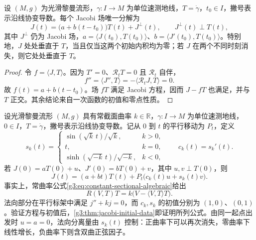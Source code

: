 \begin{proposition}\label{g3:prop:jacobi-tangential-normal}
	设 \((M,g)\) 为光滑黎曼流形，\(\gamma:I\to M\) 为单位速测地线，\(T=\dot\gamma\)，\(t_0\in I\)，撇号表示沿线协变导数。每个 Jacobi 场唯一分解为
	\begin{equation}\label{g3:eq:jacobi-tangential-normal}
		J(t)=\bigl(a+b(t-t_0)\bigr)T(t)+J^\perp(t),
		\qquad J^\perp(t)\perp T(t),
	\end{equation}
	其中 \(J^\perp\) 仍为 Jacobi 场，\(a=\langle J(t_0),T(t_0)\rangle\)、\(b=\langle J'(t_0),T(t_0)\rangle\)。特别地，\(J\) 处处垂直于 \(T\)，当且仅当这两个初始内积均为零；若 \(J\) 在两个不同时刻消失，则它处处垂直于 \(T\)。
\end{proposition}
\begin{proof}
	令 \(f=\langle J,T\rangle\)。因为 \(T'=0\)、\(\mathcal R_tT=0\) 且 \(\mathcal R_t\) 自伴，
	\[
		f''=\langle J'',T\rangle=-\langle\mathcal R_tJ,T\rangle=0.
	\]
	故 \(f(t)=a+b(t-t_0)\)。场 \(fT\) 满足 Jacobi 方程，因而 \(J-fT\) 也满足，并与 \(T\) 正交。其余结论来自一次函数的初值和零点性质。
\end{proof}

\begin{example}\label{g3:exm:constant-curvature-jacobi}
	设光滑黎曼流形 \((M,g)\) 具有常截面曲率 \(k\in\mathbb R\)，\(\gamma:I\to M\) 为单位速测地线，\(0\in I\)，\(T=\dot\gamma\)，撇号表示沿线协变导数。记从 \(0\) 到 \(t\) 的平行移动为 \(P_t\)，定义
	\begin{equation}\label{g3:eq:model-jacobi-functions}
		s_k(t)=
		\begin{cases}
			\sin(\sqrt{k}\,t)/\sqrt{k},&k>0,\\
			t,&k=0,\\
			\sinh(\sqrt{-k}\,t)/\sqrt{-k},&k<0,
		\end{cases}
		\qquad c_k(t)=s_k'(t).
	\end{equation}
	若 \(J(0)=aT(0)+u\)、\(J'(0)=bT(0)+v\)，其中 \(u,v\perp T(0)\)，则
	\begin{equation}\label{g3:eq:constant-curvature-jacobi-solution}
		J(t)=(a+bt)T(t)+P_t\bigl(c_k(t)u+s_k(t)v\bigr).
	\end{equation}
	事实上，常曲率公式\eqref{g3:eq:constant-sectional-algebraic}给出
	\[
		R(V,T)T=k\bigl(V-\langle V,T\rangle T\bigr).
	\]
	法向部分在平行标架中满足 \(j''+kj=0\)，而 \(c_k,s_k\) 的初值分别为 \((1,0)\)、\((0,1)\)。验证方程与初值后，\cref{g3:thm:jacobi-initial-data}即证明所列公式。由同一起点出发时 \(u=a=0\)，法向分离量由 \(s_k(t)\) 控制：正曲率下可以再次消失，零曲率下线性增长，负曲率下则含双曲正弦因子。
\end{example}

